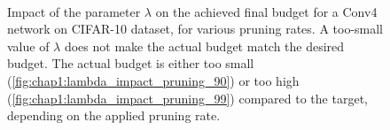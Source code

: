 \begin{figure}
  \centering
  \\
  \caption{ Impact of the parameter $\lambda$ on the achieved final
    budget for a Conv4 network on CIFAR-10 dataset, for various pruning rates. A
    too-small value of $\lambda$ does not make the actual budget match the desired
    budget. The actual budget is either too small
    (\cref{fig:chap1:lambda_impact_pruning_90}) or too high
    (\cref{fig:chap1:lambda_impact_pruning_99}) compared to the target, depending
    on the applied pruning rate.}
  \label{fig:chap1:lambda_impact}
\end{figure}


